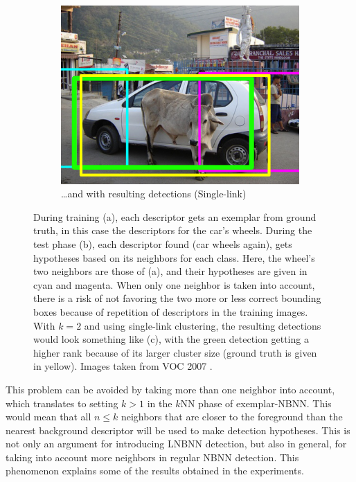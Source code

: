 \begin{figure}[hbt]
    ~
    \begin{subfigure}[b]{0.3\textwidth}
        \centering
        \includegraphics[width=\textwidth]{aliasing3}
        \caption{\ldots and with resulting detections (Single-link)}
        \label{fig:aliasdet}
    \end{subfigure}
    \caption{During training (a), each descriptor gets an exemplar from ground truth, in this case the descriptors for the car's wheels. During the test phase (b), each descriptor found (car wheels again), gets hypotheses based on its neighbors for each class. Here, the wheel's two neighbors are those of (a), and their hypotheses are given in cyan and magenta. When only one neighbor is taken into account, there is a risk of not favoring the two more or less correct bounding boxes because of repetition of descriptors in the training images. With $k=2$ and using single-link clustering, the resulting detections would look something like (c), with the green detection getting a higher rank because of its larger cluster size (ground truth is given in yellow). Images taken from VOC 2007 \cite{pascal-voc-2007}.}
    \label{fig:aliasing}
\end{figure}

This problem can be avoided by taking more than one neighbor into account, which translates to setting $k>1$ in the $k$NN phase of exemplar-NBNN. This would mean that all $n\leq k$ neighbors that are closer to the foreground than the nearest background descriptor will be used to make detection hypotheses. This is not only an argument for introducing LNBNN detection, but also in general, for taking into account more neighbors in regular NBNN detection. This phenomenon explains some of the results obtained in the experiments.


